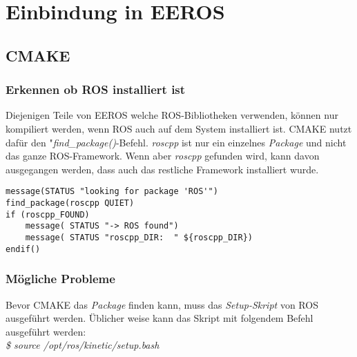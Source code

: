 \chapter{Einbindung in EEROS}


\section{CMAKE}
\subsection{Erkennen ob ROS installiert ist}
Diejenigen Teile von EEROS welche ROS-Bibliotheken verwenden, können nur kompiliert werden, wenn ROS auch auf dem System installiert ist.
CMAKE nutzt dafür den "\textit{find\_package()}-Befehl.
\textit{roscpp} ist nur ein  einzelnes \textit{Package} und nicht das ganze ROS-Framework.
Wenn aber \textit{roscpp} gefunden wird, kann davon ausgegangen werden, dass auch das restliche Framework installiert wurde.

\lstset{language=c}
\begin{lstlisting}
message(STATUS "looking for package 'ROS'")
find_package(roscpp QUIET)
if (roscpp_FOUND)
	message( STATUS "-> ROS found")
	message( STATUS "roscpp_DIR:  " ${roscpp_DIR})
endif()
\end{lstlisting}

\subsection{Mögliche Probleme}
Bevor CMAKE das \textit{Package} finden kann, muss das \textit{Setup-Skript} von ROS ausgeführt werden.
Üblicher weise kann das Skript mit folgendem Befehl ausgeführt werden:\\
\textit{\$ source /opt/ros/kinetic/setup.bash}

